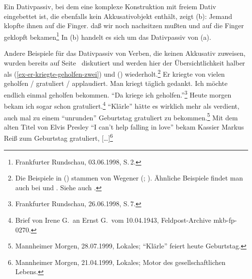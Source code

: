 Ein Dativpassiv, bei dem eine komplexe Konstruktion mit freiem Dativ eingebettet ist,
die ebenfalls kein Akkusativobjekt enthält, zeigt (b):
\eal
\ex Jemand klopfte ihnen auf die Finger.
\ex\label{bsp-auf-die-finger-geklopft-bekommen}
daß wir noch nachsitzen mußten und auf die Finger geklopft bekamen\footnote{
        Frankfurter Rundschau, 03.06.1998, S.\,2.%
}
\zl
In (b) handelt es sich um das Dativpassiv von (a).
%

Andere Beispiele für das Dativpassiv von Verben, die keinen Akkusativ
zuweisen, wurden bereits auf Seite~\pageref{ex-er-kriegte-geholfen}
diskutiert und werden hier der Übersichtlichkeit halber
als (\ref{ex-er-kriegte-geholfen-zwei}) und () wiederholt.\footnote{
        Die Beispiele in () stammen von Wegener (\citeyear[]{Wegener85a}; \citeyear[]{Wegener90}).
        Ähnliche Beispiele findet man auch bei  und
        . Siehe auch .%
}
\eal
\label{ex-er-kriegte-geholfen-zwei}
\ex{}
Er kriegte von vielen geholfen / gratuliert / applaudiert.
\ex{} 
Man kriegt täglich gedankt.
\ex Ich möchte endlich einmal geholfen bekommen.
\zl
\eal
\ex
"`Da kriege ich geholfen."'\footnote{
Frankfurter Rundschau, 26.06.1998, S.\,7.%
}
\ex
Heute morgen bekam ich sogar schon gratuliert.\footnote{%
Brief von Irene G.\ an Ernst G.\ vom 10.04.1943, Feldpost-Archive mkb-fp-0270.}
\ex
"`Klärle"' hätte es wirklich mehr als verdient, auch mal zu einem "`unrunden"' Geburtstag gratuliert zu bekommen.\footnote{
Mannheimer Morgen, 28.07.1999, Lokales; "`Klärle"' feiert heute Geburtstag.%
}
\ex Mit dem alten Titel von Elvis Presley "`I can't help falling in love"' 
    bekam Kassier Markus Reiß zum Geburtstag gratuliert, [\ldots]\footnote{
Mannheimer Morgen, 21.04.1999, Lokales; Motor des gesellschaftlichen Lebens.%
}
\zl

